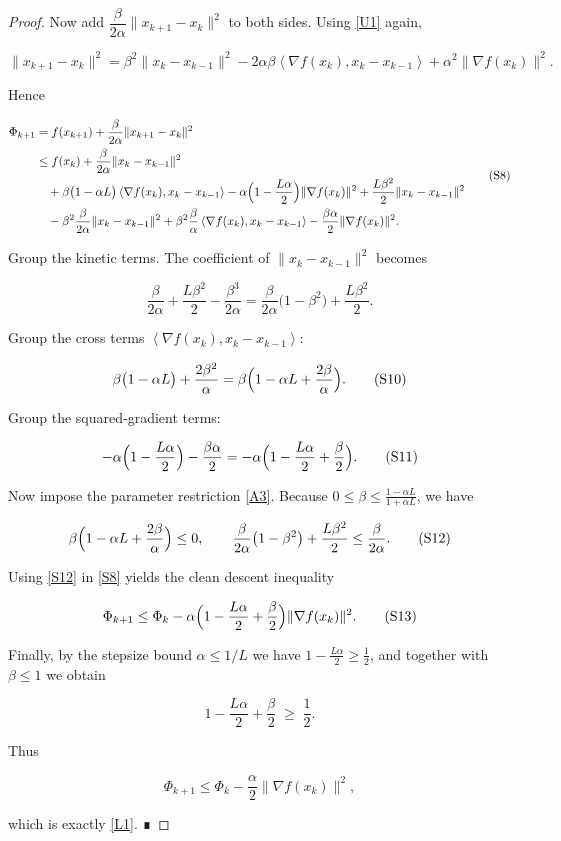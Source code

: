 \documentclass{article}
\newcommand{\inner}[2]{\left\langle #1,#2\right\rangle}
\begin{document}
\begin{proof}
Now add $\dfrac{\beta}{2\alpha}\|x_{k+1}-x_k\|^2$ to both sides.  
Using \eqref{U1} again,

\[
\|x_{k+1}-x_k\|^2
= \beta^{2}\|x_k-x_{k-1}\|^2
-2\alpha\beta\inner{\nabla f(x_k)}{x_k-x_{k-1}}
+\alpha^{2}\|\nabla f(x_k)\|^2 .\tag{S7}
\]

Hence

\[
\begin{aligned}
\Phi_{k+1}
&= f(x_{k+1})+\frac{\beta}{2\alpha}\|x_{k+1}-x_k\|^2\\
&\le f(x_k)+\frac{\beta}{2\alpha}\|x_k-x_{k-1}\|^2 \\
&\quad +\beta\bigl(1-\alpha L\bigr)\inner{\nabla f(x_k)}{x_k-x_{k-1}}
-\alpha\Bigl(1-\frac{L\alpha}{2}\Bigr)\|\nabla f(x_k)\|^2
+\frac{L\beta^{2}}{2}\|x_k-x_{k-1}\|^2 \\
&\quad -\beta^{2}\frac{\beta}{2\alpha}\|x_k-x_{k-1}\|^2
+\beta^{2}\frac{\beta}{\alpha}\inner{\nabla f(x_k)}{x_k-x_{k-1}}
-\frac{\beta\alpha}{2}\|\nabla f(x_k)\|^2 .
\end{aligned}
\tag{S8}
\]

Group the kinetic terms.  The coefficient of $\|x_k-x_{k-1}\|^2$ becomes  

\[
\frac{\beta}{2\alpha}
+\frac{L\beta^{2}}{2}
-\frac{\beta^{3}}{2\alpha}
= \frac{\beta}{2\alpha}\bigl(1-\beta^{2}\bigr)+\frac{L\beta^{2}}{2}. \tag{S9}
\]

Group the cross terms $\inner{\nabla f(x_k)}{x_k-x_{k-1}}$:

\[
\beta\bigl(1-\alpha L\bigr)
+\frac{2\beta^{2}}{\alpha}
= \beta\Bigl(1-\alpha L+\frac{2\beta}{\alpha}\Bigr). \tag{S10}
\]

Group the squared‑gradient terms:

\[
-\alpha\Bigl(1-\frac{L\alpha}{2}\Bigr)-\frac{\beta\alpha}{2}
= -\alpha\Bigl(1-\frac{L\alpha}{2}+\frac{\beta}{2}\Bigr). \tag{S11}
\]

Now impose the parameter restriction \eqref{A3}.  
Because $0\le\beta\le\frac{1-\alpha L}{1+\alpha L}$, we have  

\[
\beta\Bigl(1-\alpha L+\frac{2\beta}{\alpha}\Bigr)\le 0, \qquad
\frac{\beta}{2\alpha}\bigl(1-\beta^{2}\bigr)+\frac{L\beta^{2}}{2}\le \frac{\beta}{2\alpha}.
\tag{S12}
\]

Using \eqref{S12} in \eqref{S8} yields the clean descent inequality  

\[
\Phi_{k+1}\le \Phi_k
-\alpha\Bigl(1-\frac{L\alpha}{2}+\frac{\beta}{2}\Bigr)\|\nabla f(x_k)\|^2 .
\tag{S13}
\]

Finally, by the stepsize bound $\alpha\le 1/L$ we have $1-\frac{L\alpha}{2}\ge\frac12$, and together with $\beta\le1$ we obtain  

\[
1-\frac{L\alpha}{2}+\frac{\beta}{2}\;\ge\;\frac12 .
\]

Thus

\[
\Phi_{k+1}\le \Phi_k-\frac{\alpha}{2}\|\nabla f(x_k)\|^2,
\]

which is exactly \eqref{L1}.  ∎
\end{proof}
\end{document}
